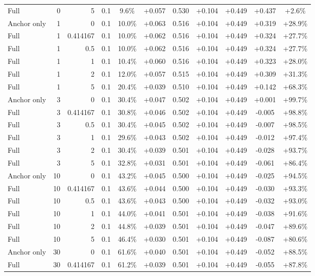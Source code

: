 \begin{table}[htbp]
\begin{tabular}{lrrrccccccc}
Full & 0 & 5 & 0.1 & 9.6\% & +0.057 & 0.530 & +0.104 & +0.449 & +0.437 & +2.6\% \\
Anchor only & 1 & 0 & 0.1 & 10.0\% & +0.063 & 0.516 & +0.104 & +0.449 & +0.319 & +28.9\% \\
Full & 1 & 0.414167 & 0.1 & 10.0\% & +0.062 & 0.516 & +0.104 & +0.449 & +0.324 & +27.7\% \\
Full & 1 & 0.5 & 0.1 & 10.0\% & +0.062 & 0.516 & +0.104 & +0.449 & +0.324 & +27.7\% \\
Full & 1 & 1 & 0.1 & 10.4\% & +0.060 & 0.516 & +0.104 & +0.449 & +0.323 & +28.0\% \\
Full & 1 & 2 & 0.1 & 12.0\% & +0.057 & 0.515 & +0.104 & +0.449 & +0.309 & +31.3\% \\
Full & 1 & 5 & 0.1 & 20.4\% & +0.039 & 0.510 & +0.104 & +0.449 & +0.142 & +68.3\% \\
Anchor only & 3 & 0 & 0.1 & 30.4\% & +0.047 & 0.502 & +0.104 & +0.449 & +0.001 & +99.7\% \\
Full & 3 & 0.414167 & 0.1 & 30.8\% & +0.046 & 0.502 & +0.104 & +0.449 & -0.005 & +98.8\% \\
Full & 3 & 0.5 & 0.1 & 30.4\% & +0.045 & 0.502 & +0.104 & +0.449 & -0.007 & +98.5\% \\
Full & 3 & 1 & 0.1 & 29.6\% & +0.043 & 0.502 & +0.104 & +0.449 & -0.012 & +97.4\% \\
Full & 3 & 2 & 0.1 & 30.4\% & +0.039 & 0.501 & +0.104 & +0.449 & -0.028 & +93.7\% \\
Full & 3 & 5 & 0.1 & 32.8\% & +0.031 & 0.501 & +0.104 & +0.449 & -0.061 & +86.4\% \\
Anchor only & 10 & 0 & 0.1 & 43.2\% & +0.045 & 0.500 & +0.104 & +0.449 & -0.025 & +94.5\% \\
Full & 10 & 0.414167 & 0.1 & 43.6\% & +0.044 & 0.500 & +0.104 & +0.449 & -0.030 & +93.3\% \\
Full & 10 & 0.5 & 0.1 & 43.6\% & +0.043 & 0.500 & +0.104 & +0.449 & -0.032 & +93.0\% \\
Full & 10 & 1 & 0.1 & 44.0\% & +0.041 & 0.501 & +0.104 & +0.449 & -0.038 & +91.6\% \\
Full & 10 & 2 & 0.1 & 44.8\% & +0.039 & 0.501 & +0.104 & +0.449 & -0.047 & +89.6\% \\
Full & 10 & 5 & 0.1 & 46.4\% & +0.030 & 0.501 & +0.104 & +0.449 & -0.087 & +80.6\% \\
Anchor only & 30 & 0 & 0.1 & 61.6\% & +0.040 & 0.501 & +0.104 & +0.449 & -0.052 & +88.5\% \\
Full & 30 & 0.414167 & 0.1 & 61.2\% & +0.039 & 0.501 & +0.104 & +0.449 & -0.055 & +87.8\% \\

\end{tabular}
\end{table}
